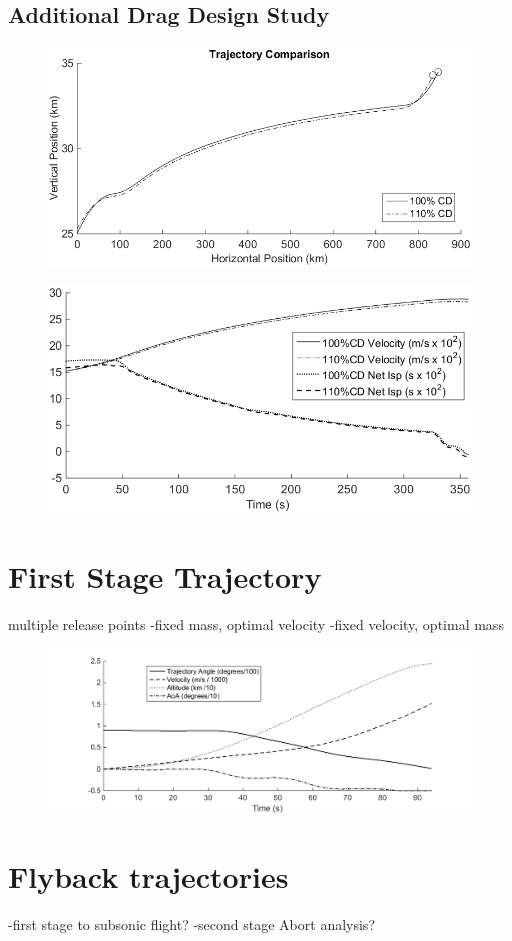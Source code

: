 \subsection{Additional Drag Design Study}
\begin{figure}
\centering
\includegraphics[width=0.9\linewidth]{figures/5_Ascent/DragComparisonTraj}
\caption{}
\label{fig:DragComparisonTraj}
\end{figure}
\begin{figure}
\centering
\includegraphics[width=0.8\linewidth]{figures/5_Ascent/DragComparisonOther}
\caption{}
\label{fig:DragComparisonOther}
\end{figure}

\section{First Stage Trajectory}
multiple release points
-fixed mass, optimal velocity
-fixed velocity, optimal mass


\begin{figure}
\centering
\includegraphics[width=1\linewidth]{figures/5_Ascent/FirstStage}
\caption{}
\label{fig:FirstStage}
\end{figure}


\section{Flyback trajectories }

-first stage to subsonic flight? 
-second stage
Abort analysis?